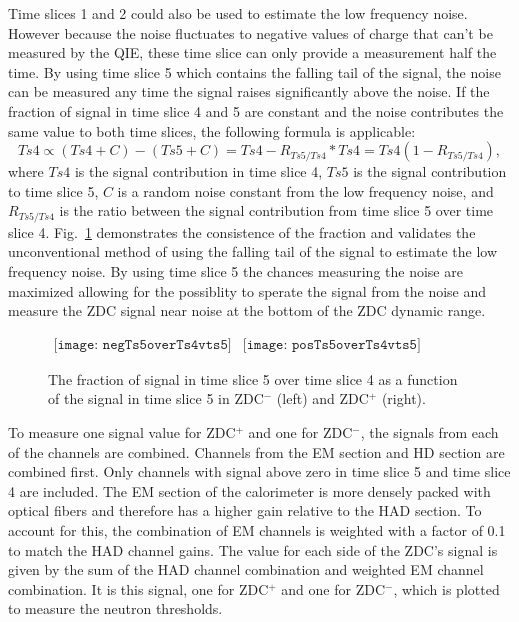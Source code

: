       Time slices 1 and 2 could also be used to estimate the low frequency 
        noise.
      However because the noise fluctuates to negative values of charge that 
        can't be measured by the QIE, these time slice can only provide a 
        measurement half the time. 
      By using time slice 5 which contains the falling tail of the signal, 
        the noise can be measured any time the signal raises significantly 
        above the noise.
      If the fraction of signal in time slice 4 and 5 are constant and
        the noise contributes the same value to both time slices, the 
        following formula is applicable:
      \begin{equation}
        Ts4 \propto (Ts4 + C) - ( Ts5 + C ) = Ts4 - R_{Ts5/Ts4}*Ts4 
        = Ts4(1-R_{Ts5/Ts4}),
        \label{eq:ts4ish}
      \end{equation}
      where $Ts4$ is the signal contribution in time slice 4, $Ts5$ is the 
        signal contribution to time slice 5, $C$ is a random noise constant
        from the low frequency noise, and $R_{Ts5/Ts4}$ is the ratio between
        the signal contribution from time slice 5 over time slice 4.
      Fig.~\ref{fig:zdcTs4OvTs5VTs5} demonstrates the consistence of the 
        fraction and validates the unconventional method of using the falling 
        tail of the signal to estimate the low frequency noise. 
      By using time slice 5 the chances measuring the noise are maximized 
        allowing for the possiblity to sperate the signal from the noise and
        measure the ZDC signal near noise at the bottom of the ZDC dynamic 
        range.
      \begin{figure}[!Hhbt]
        \centering
        $ \begin{array}{cc}
          \texttt{[image: negTs5overTs4vts5]} &
          \texttt{[image: posTs5overTs4vts5]}
        \end{array} $  
        \caption{ The fraction of signal in time slice 5 over time slice 4 
          as a function of the signal in time slice 5 in ZDC$^{-}$ (left) and 
          ZDC$^{+}$ (right).}
        \label{fig:zdcTs4OvTs5VTs5}
      \end{figure}
      
      To measure one signal value for ZDC$^{+}$ and one for ZDC$^{-}$, the 
        signals from each of the channels are combined.
      Channels from the EM section and HD section are combined first. 
      Only channels with signal above zero in time slice 5 and time slice 
        4 are included. 
      The EM section of the calorimeter is more densely packed with optical 
        fibers and therefore has a higher gain relative to the HAD section. 
      To account for this, the combination of EM channels is weighted with
        a factor of 0.1 to match the HAD channel gains.
      The value for each side of the ZDC's signal is given by the sum of the 
        HAD channel combination and weighted EM channel combination.
      It is this signal, one for ZDC$^{+}$ and one for ZDC$^{-}$, 
        which is plotted to measure the neutron thresholds.

